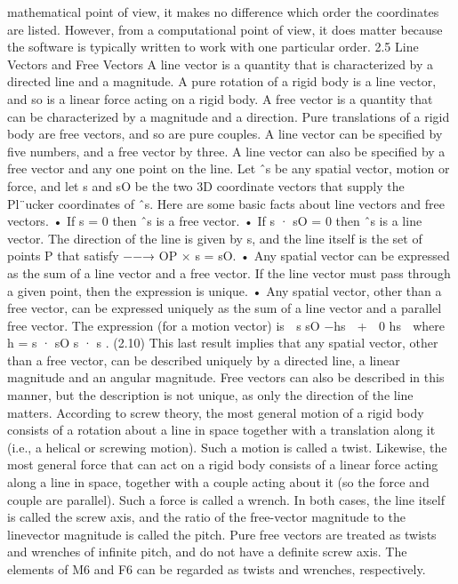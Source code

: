 mathematical point of view, it makes no difference which order the coordinates are listed. However, from a computational point of view, it does matter because the software is typically written to work with one particular order. 2.5 Line Vectors and Free Vectors A line vector is a quantity that is characterized by a directed line and a magnitude. A pure rotation of a rigid body is a line vector, and so is a linear force acting on a rigid body. A free vector is a quantity that can be characterized by a magnitude and a direction. Pure translations of a rigid body are free vectors, and so are pure couples. A line vector can be specified by five numbers, and a free vector by three. A line vector can also be specified by a free vector and any one point on the line. Let ˆs be any spatial vector, motion or force, and let s and sO be the two 3D coordinate vectors that supply the Pl¨ucker coordinates of ˆs. Here are some basic facts about line vectors and free vectors. • If s = 0 then ˆs is a free vector. • If s · sO = 0 then ˆs is a line vector. The direction of the line is given by s, and the line itself is the set of points P that satisfy −−→ OP × s = sO. • Any spatial vector can be expressed as the sum of a line vector and a free vector. If the line vector must pass through a given point, then the expression is unique. • Any spatial vector, other than a free vector, can be expressed uniquely as the sum of a line vector and a parallel free vector. The expression (for a motion vector) is  s sO −hs  +  0 hs  where h = s · sO s · s . (2.10) This last result implies that any spatial vector, other than a free vector, can be described uniquely by a directed line, a linear magnitude and an angular magnitude. Free vectors can also be described in this manner, but the description is not unique, as only the direction of the line matters. According to screw theory, the most general motion of a rigid body consists of a rotation about a line in space together with a translation along it (i.e., a helical or screwing motion). Such a motion is called a twist. Likewise, the most general force that can act on a rigid body consists of a linear force acting along a line in space, together with a couple acting about it (so the force and couple are parallel). Such a force is called a wrench. In both cases, the line itself is called the screw axis, and the ratio of the free-vector magnitude to the linevector magnitude is called the pitch. Pure free vectors are treated as twists and wrenches of infinite pitch, and do not have a definite screw axis. The elements of M6 and F6 can be regarded as twists and wrenches, respectively.

